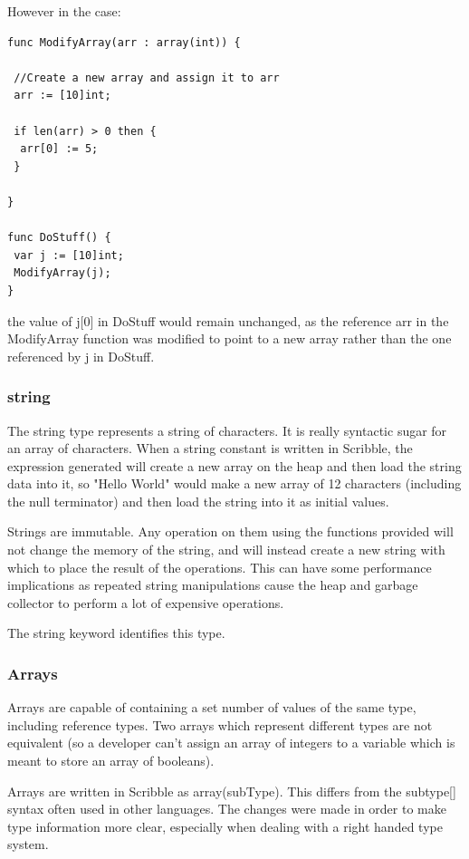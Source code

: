 \documentclass[]{final_report}
\begin{document}
However in the case:
\begin{verbatim}
func ModifyArray(arr : array(int)) {

 //Create a new array and assign it to arr
 arr := [10]int;

 if len(arr) > 0 then {
  arr[0] := 5;
 }

}

func DoStuff() {
 var j := [10]int;
 ModifyArray(j);
}
\end{verbatim}
the value of j[0] in DoStuff would remain unchanged, as the reference arr in the ModifyArray function was modified to point to a new array rather than the one referenced by j in DoStuff.

\subsubsection{string}

The string type represents a string of characters. It is really syntactic sugar for an array of characters. When a string constant is written in Scribble, the expression generated will create a new array on the heap and then load the string data into it, so "Hello World" would make a new array of 12 characters (including the null terminator) and then load the string into it as initial values.

Strings are immutable. Any operation on them using the functions provided will not change the memory of the string, and will instead create a new string with which to place the result of the operations. This can have some performance implications as repeated string manipulations cause the heap and garbage collector to perform a lot of expensive operations.

The string keyword identifies this type.

\subsubsection{Arrays}

Arrays are capable of containing a set number of values of the same type, including reference types. Two arrays which represent different types are not equivalent (so a developer can't assign an array of integers to a variable which is meant to store an array of booleans).

Arrays are written in Scribble as array(subType). This differs from the subtype[] syntax often used in other languages. The changes were made in order to make type information more clear, especially when dealing with a right handed type system.
\end{document}
